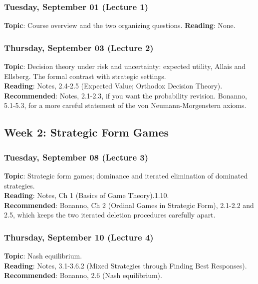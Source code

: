 \documentclass[
  letterpaper,
  DIV=11,
  numbers=noendperiod]{scrartcl}
\begin{document}
\subsubsection{Tuesday, September 01 (Lecture
1)}\label{tuesday-september-01-lecture-1}

\textbf{Topic}: Course overview and the two organizing questions.
\textbf{Reading}: None.

\subsubsection{Thursday, September 03 (Lecture
2)}\label{thursday-september-03-lecture-2}

\textbf{Topic}: Decision theory under risk and uncertainty: expected
utility, Allais and Ellsberg. The formal contrast with strategic
settings.\\
\textbf{Reading}: Notes, 2.4-2.5 (Expected Value; Orthodox Decision
Theory).\\
\textbf{Recommended}: Notes, 2.1-2.3, if you want the probability
revision. Bonanno, 5.1-5.3, for a more careful statement of the von
Neumann-Morgenstern axioms.

\subsection{Week 2: Strategic Form
Games}\label{week-2-strategic-form-games}

\subsubsection{Tuesday, September 08 (Lecture
3)}\label{tuesday-september-08-lecture-3}

\textbf{Topic}: Strategic form games; dominance and iterated elimination
of dominated strategies.\\
\textbf{Reading}: Notes, Ch 1 (Basics of Game Theory).1.10.\\
\textbf{Recommended}: Bonanno, Ch 2 (Ordinal Games in Strategic Form),
2.1-2.2 and 2.5, which keeps the two iterated deletion procedures
carefully apart.

\subsubsection{Thursday, September 10 (Lecture
4)}\label{thursday-september-10-lecture-4}

\textbf{Topic}: Nash equilibrium.\\
\textbf{Reading}: Notes, 3.1-3.6.2 (Mixed Strategies through Finding
Best Responses).\\
\textbf{Recommended}: Bonanno, 2.6 (Nash equilibrium).
\end{document}
